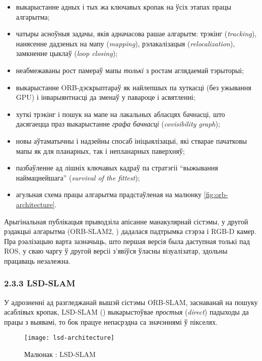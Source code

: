 \begin{itemize}
  \item выкарыстанне адных і тых жа ключавых кропак на ўсіх этапах працы алгарытма;
  \item чатыры асноўныя задачы, якія адначасова рашае алгарытм: трэкінг (\textit{tracking}),
  нанясенне дадзеных на мапу (\textit{mapping}), рэлакалізацыя (\textit{relocalization}),
  замкненне цыклаў (\textit{loop closing});
  \item неабмежаваны рост памераў мапы \textit{толькі} з ростам аглядаемай тэрыторыі;
  \item выкарыстанне ORB-дэскрыптараў як найлепшых па хуткасці (без ужывання GPU)
  і інварыянтнасці да зменаў у павароце і асвятленні;
  \item хуткі трэкінг і пошук на мапе на лакальных абласцях бачнасці, што дасягаецца
  праз выкарыстанне \textit{графа бачнасці} (\textit{covisibility graph});
  \item новы аўтаматычны і надзейны спосаб ініцыялізацыі, які стварае пачатковы мапы
  як для планарных, так і непланарных паверхняў;
  \item пазбаўленне ад лішніх ключавых кадраў па стратэгіі ``выжывання наймацнейшага''
  (\textit{survival of the fittest});
  \item агульная схема працы алгарытма прадстаўленая на малюнку \ref{fig:orb-architecture}.
\end{itemize}

Арыгінальная публікацыя \cite{murTRO2015} прыводзіла апісанне манакулярнай сістэмы,
у другой рэдакцыі алгарытма (ORB-SLAM2, \cite{murORB2}) дадалася падтрымка стэрэа і RGB-D камер.
Пра рэалізацыю варта зазначыць, што першая версія была даступная толькі пад ROS,
у сваю чаргу ў другой версіі з'явіўся ўласны візуалізатар, здольны працаваць незалежна.

\subsubsection*{2.3.3 LSD-SLAM}

У адрозненні ад разгледжанай вышэй сістэмы ORB-SLAM, заснаванай на пошуку
асаблівых кропак, LSD-SLAM (\cite{engel14eccv}) выкарыстоўвае \textit{простыя} (\textit{direct})
падыходы да працы з выявамі, то бок працуе непасрэдна са значэннямі ў пікселях.

\begin{figure}[H]
  \centering
  \texttt{[image: lsd-architecture]}
  \captionsetup{labelformat=empty}
  \caption{Малюнак : LSD-SLAM}
  \label{fig:lsd-architecture}
\end{figure}

